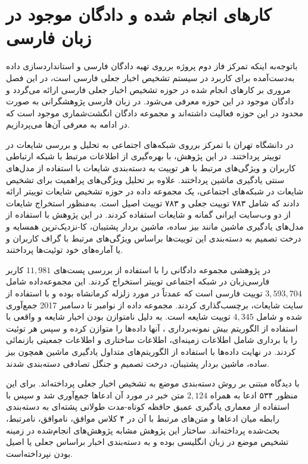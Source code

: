 \section{کارهای انجام شده و دادگان موجود در زبان فارسی}
باتوجه‌به اینکه تمرکز فاز دوم  پروژه برروی تهیه دادگان فارسی و استانداردسازی داده به‌دست‌آمده برای کاربرد در سیستم تشخیص اخبار جعلی فارسی است، در این فصل مروری بر کارهای انجام شده در حوزه تشخیص اخبار جعلی فارسی ارائه می‌گردد و دادگان موجود در این حوزه معرفی می‌شود.
در زبان فارسی پژوهشگرانی به صورت محدود در این حوزه فعالیت داشته‌اند و مجموعه دادگان انگشت‌شماری موجود است که در ادامه به معرفی آن‌ها می‌پردازیم.


\citet{zamani2017rumor} در دانشگاه تهران  با تمرکز برروی شبکه‌های اجتماعی به تحلیل و بررسی شایعات در توییتر پرداختند. در این پژوهش، با بهره‌گیری از اطلاعات مرتبط با شبکه ارتباطی کاربران و ویژگی‌های مرتبط با هر توییت به دسته‌بندی شایعات با استفاده از مدل‌های سنتی یادگیری ماشین پرداختند. علاوه بر تحلیل ویژگی‌های پراهمیت برای تشخیص شایعات در شبکه‌های اجتماعی، یک مجموعه داده در حوزه تشخیص شایعات توییتر ارائه دادند که شامل ۷۸۳ توییت جعلی و ۷۸۳ توییت اصیل است. به‌منظور استخراج شایعات از دو وب‌سایت ایرانی گمانه و شایعات استفاده کردند.
در این پژوهش با استفاده از مدل‌های یادگیری ماشین مانند بیز ساده، ماشین بردار پشتیبان، کا-نزدیک‌ترین همسایه و درخت تصمیم به دسته‌بندی این توییت‌ها براساس ویژگی‌های مرتبط با گراف کاربران و یا آماره‌های خود توئیت‌ها پرداختند.

\citet{mahmoodabad2018persian} در پژوهشی مجموعه دادگانی را با استفاده از بررسی پست‌های $11,981$ کاربر فارسی‌‌زبان در شبکه اجتماعی توییتر استخراج کردند.  این مجموعه‌داده شامل $3,593,704$ توییت فارسی است که عمدتاً در  مورد زلزله کرمانشاه بوده و با استفاده از سایت شایعات، برچسب‌گذاری کردند. مجموعه داده از نوامبر تا دسامبر 2017 جمع‌آوری شده و شامل $4,345$ توییت‌ شایعه است.
%
به دلیل نامتوازن ‌بودن اخبار شایعه و واقعی با استفاده از الگوریتم بیش نمونه‌برداری ، آنها داده‌ها را متوازن کرده و سپس هر توئیت را با برداری شامل اطلاعات زمینه‌ای، اطلاعات ساختاری و اطلاعات جمعیتی بازنمائی کردند. در نهایت داده‌ها با استفاده از الگوریتم‌های متداول یادگیری ماشین همچون بیز ساده، ماشین بردار پشتیبان، درخت تصمیم و جنگل تصادفی دسته‌بندی شدند.

\cite{zarharan2019persian}
با دیدگاه مبتنی بر روش دسته‌بندی موضع به تشخیص اخبار جعلی پرداخته‌اند.  
برای این منظور  ۵۳۴ ادعا به همراه  $2,124$ متن خبر در مورد آن ادعاها جمع‌آوری شد و سپس با استفاده از معماری یادگیری عمیق  حافظه کوتاه-مدت طولانی پشته‌ای به دسته‌بندی رابطه میان ادعاها و متن‌های مرتبط با آن در ۴ کلاس موافق، ناموافق، نامرتبط، بحث‌شده پرداخته‌اند. ساختار این پژوهش مشابه پژوهش‌های انجام‌شده در زمینه تشخیص موضع در زبان انگلیسی بوده  و به دسته‌بندی اخبار براساس جعلی یا اصیل بودن نپرداخته‌است.



